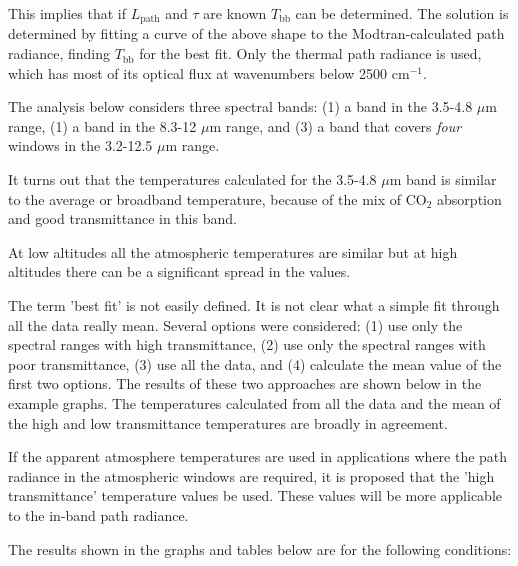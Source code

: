 \documentclass{workpackage}
\begin{document}
This implies that if $L_\textrm{path}$ and $\tau$ are known $T_\textrm{bb}$ can be determined.  The solution is determined by fitting a curve of the above shape to the Modtran-calculated path radiance, finding $T_\textrm{bb}$ for the best fit.  Only the thermal path radiance is used, which has most of its optical flux at wavenumbers below 2500 cm$^{-1}$.


The analysis below considers three spectral bands: (1) a band in the 3.5-4.8 $\mu$m range, (1) a band in the 8.3-12 $\mu$m range, and (3) a band that covers \textit{four} windows in the 3.2-12.5 $\mu$m range.


It turns out that the temperatures calculated for the 3.5-4.8 $\mu$m band is similar to the average or broadband temperature, because of the mix of CO$_2$ absorption and good transmittance in this band.


At low altitudes all the atmospheric temperatures are similar but at high altitudes there can be a significant spread in the values.


The term 'best fit' is not easily defined.  It is not clear what a simple fit through all the data really mean.  Several options were considered: (1) use only the spectral ranges with high transmittance, (2) use only the spectral ranges with poor transmittance, (3) use all the data, and (4) calculate the mean value of the first two options.
The results of these two approaches are shown below in the example graphs.  The temperatures calculated from all the data and the mean of the high and low transmittance temperatures are broadly in agreement.


If the apparent atmosphere temperatures are used in applications where the path radiance in the atmospheric windows are required, it is proposed that the 'high transmittance' temperature values be used. These values will be more applicable to the in-band path radiance.


The results shown in the graphs and tables below are for the following conditions:
\end{document}
